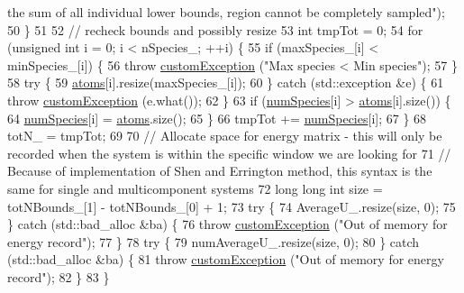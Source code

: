 \begin{DoxyCode}
{       the sum of all individual lower bounds, region cannot be completely sampled"});
50                 \}
51                 
52                 \textcolor{comment}{// recheck bounds and possibly resize}
53                 \textcolor{keywordtype}{int} tmpTot = 0;
54     \textcolor{keywordflow}{for} (\textcolor{keywordtype}{unsigned} \textcolor{keywordtype}{int} i = 0; i < nSpecies\_; ++i) \{
55         \textcolor{keywordflow}{if} (maxSpecies\_[i] < minSpecies\_[i]) \{
56             \textcolor{keywordflow}{throw} \hyperlink{classcustom_exception}{customException} (\textcolor{stringliteral}{"Max species < Min species"});
57         \}
58                                 \textcolor{keywordflow}{try} \{
59                                                 \hyperlink{classsim_system_a90421b19082f7fb8fc23b7264b1161e4}{atoms}[i].resize(maxSpecies\_[i]);
60                                 \} \textcolor{keywordflow}{catch} (std::exception &e) \{
61                                                 \textcolor{keywordflow}{throw} \hyperlink{classcustom_exception}{customException} (e.what());
62                                 \}
63                                 \textcolor{keywordflow}{if} (\hyperlink{classsim_system_a9eea865e6dc1cff377b1e79c4d9c23f0}{numSpecies}[i] > \hyperlink{classsim_system_a90421b19082f7fb8fc23b7264b1161e4}{atoms}[i].size()) \{
64                                                 \hyperlink{classsim_system_a9eea865e6dc1cff377b1e79c4d9c23f0}{numSpecies}[i] = \hyperlink{classsim_system_a90421b19082f7fb8fc23b7264b1161e4}{atoms}.size();
65                                 \}
66                                 tmpTot += \hyperlink{classsim_system_a9eea865e6dc1cff377b1e79c4d9c23f0}{numSpecies}[i];
67                 \}
68     totN\_ = tmpTot;
69   
70     \textcolor{comment}{// Allocate space for energy matrix - this will only be recorded when the system is within the specific
       window we are looking for}
71     \textcolor{comment}{// Because of implementation of Shen and Errington method, this syntax is the same for single and
       multicomponent systems}
72     \textcolor{keywordtype}{long} \textcolor{keywordtype}{long} \textcolor{keywordtype}{int} size = totNBounds\_[1] - totNBounds\_[0] + 1;
73     \textcolor{keywordflow}{try} \{
74                 AverageU\_.resize(size, 0); 
75     \} \textcolor{keywordflow}{catch} (std::bad\_alloc &ba) \{
76                 \textcolor{keywordflow}{throw} \hyperlink{classcustom_exception}{customException} (\textcolor{stringliteral}{"Out of memory for energy record"});
77     \}
78     \textcolor{keywordflow}{try} \{
79                 numAverageU\_.resize(size, 0);
80     \} \textcolor{keywordflow}{catch} (std::bad\_alloc &ba) \{
81         \textcolor{keywordflow}{throw} \hyperlink{classcustom_exception}{customException} (\textcolor{stringliteral}{"Out of memory for energy record"});
82     \}
83 \}
\end{DoxyCode}
\hypertarget{classsim_system_a0d910b833afccdd57e86cc45787e43a1}{}
